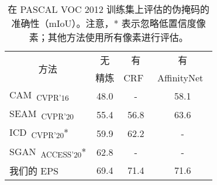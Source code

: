 \begin{table}[]
\centering
{\small
\begin{tabular}{@{}lccc@{}}
\toprule
\multicolumn{1}{c}{\multirow{2}{*}{方法}}         & 无           & 有 &                                  有 \\
                                                    & 精炼    & CRF~\cite{krahenbuhl2011efficient}    & AffinityNet~\cite{ahn2018learning}    \\ \midrule
\multicolumn{1}{l}{CAM~\cite{zhou2016learning}\textsubscript{CVPR'16}}     & 48.0          & -                                     & 58.1                                  \\
\multicolumn{1}{l}{SEAM~\cite{wang2020self}\textsubscript{CVPR'20}}        & 55.4          & 56.8                                  & 63.6                                  \\
\multicolumn{1}{l}{ICD~\cite{chen2020boundary}\textsubscript{CVPR'20}*}     & 59.9          & 62.2                                  & -                                     \\
\multicolumn{1}{l}{SGAN~\cite{yao2020saliency}\textsubscript{ACCESS'20}*}     & 62.8          & -                                     & -                                     \\
\multicolumn{1}{l}{我们的 EPS}                            & 69.4          & 71.4                                  & 71.6                                  \\ \bottomrule
\end{tabular}
}
\vspace{2mm}
\caption{在 PASCAL VOC 2012 训练集上评估的伪掩码的准确性（mIoU）。注意，* 表示忽略低置信度像素；其他方法使用所有像素进行评估。} \vspace{-3mm}
\label{tab:refinement}
\end{table}

